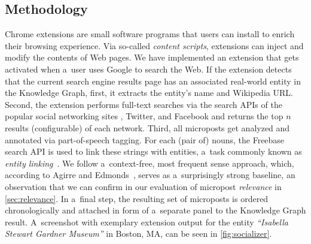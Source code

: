 \subsection{Methodology}
Chrome extensions are small software programs that users can install
to enrich their browsing experience.
Via so-called \emph{content scripts}, extensions can inject and modify the contents of Web pages.
We have implemented an extension that gets activated when a~user uses Google to search the Web.
If the extension detects that the current search engine results page
has an associated real-world entity in the Knowledge Graph,
first, it extracts the entity's name and Wikipedia URL.
Second, the extension performs full-text searches via the search APIs of
the popular social networking sites \googleplus, Twitter, and Facebook
and returns the top $n$ results (configurable) of each network.
Third, all microposts get analyzed and annotated via part-of-speech tagging.
For each (pair of) nouns, the Freebase search API is used
to link these strings with entities,
a~task commonly known as \emph{entity linking}~\cite{spitkovsky2012}.
We follow a~context-free, most frequent sense approach,
which, according to Agirre and Edmonds~\cite{agirre2007},
serves as a~surprisingly strong baseline,
an observation that we can confirm in our evaluation of micropost \emph{relevance}
in \autoref{sec:relevance}.
In a~final step, the resulting set of microposts is ordered chronologically
and attached in form of a~separate panel to the Knowledge Graph result.
A~screenshot with exemplary extension output for the entity
\emph{``Isabella Stewart Gardner Museum''} in Boston, MA,
can be seen in \autoref{fig:socializer}.

